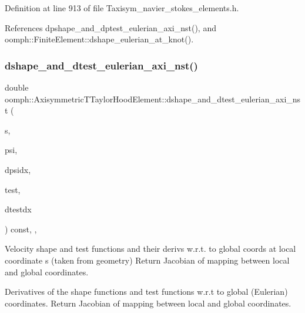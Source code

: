 Definition at line 913 of file Taxisym\+\_\+navier\+\_\+stokes\+\_\+elements.\+h.



References dpshape\+\_\+and\+\_\+dptest\+\_\+eulerian\+\_\+axi\+\_\+nst(), and oomph\+::\+Finite\+Element\+::dshape\+\_\+eulerian\+\_\+at\+\_\+knot().

\mbox{\label{classoomph_1_1AxisymmetricTTaylorHoodElement_ae5d9f04db6805c64a9c1f6d5ba68c3a4}} 
\subsubsection{\texorpdfstring{dshape\+\_\+and\+\_\+dtest\+\_\+eulerian\+\_\+axi\+\_\+nst()}{dshape\_and\_dtest\_eulerian\_axi\_nst()}}
{\footnotesize\ttfamily double oomph\+::\+Axisymmetric\+T\+Taylor\+Hood\+Element\+::dshape\+\_\+and\+\_\+dtest\+\_\+eulerian\+\_\+axi\+\_\+nst (\begin{DoxyParamCaption}\item[{const \hyperlink{classoomph_1_1Vector}{Vector}$<$ double $>$ \&}]{s,  }\item[{\hyperlink{classoomph_1_1Shape}{Shape} \&}]{psi,  }\item[{\hyperlink{classoomph_1_1DShape}{D\+Shape} \&}]{dpsidx,  }\item[{\hyperlink{classoomph_1_1Shape}{Shape} \&}]{test,  }\item[{\hyperlink{classoomph_1_1DShape}{D\+Shape} \&}]{dtestdx }\end{DoxyParamCaption}) const\hspace{0.3cm}{\ttfamily [inline]}, {\ttfamily [protected]}, {\ttfamily [virtual]}}



Velocity shape and test functions and their derivs w.\+r.\+t. to global coords at local coordinate s (taken from geometry) Return Jacobian of mapping between local and global coordinates. 

Derivatives of the shape functions and test functions w.\+r.\+t to global (Eulerian) coordinates. Return Jacobian of mapping between local and global coordinates. 

